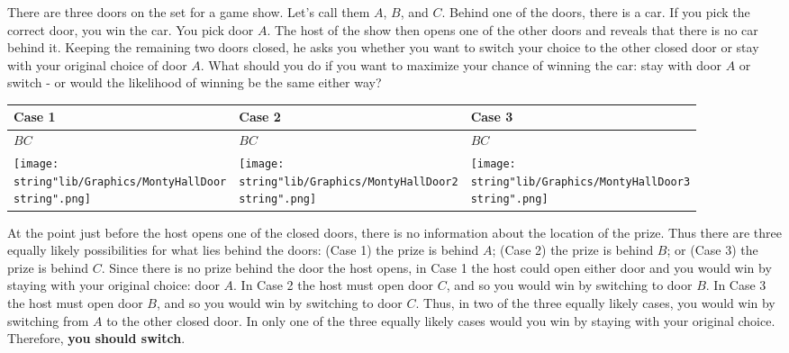 \documentclass[11pt,a4paper]{book}
\begin{document}
\begin{example}

There are three doors on the set for a game show. Let's
call them $A$, $B$, and $C$. Behind one of the doors, there is
a car. If you pick the correct door, you win the car. You pick door
$A$. The host of the show then opens one of the other doors and reveals
that there is no car behind it. Keeping the remaining two doors closed,
he asks you whether you want to switch your choice to the other closed
door or stay with your original choice of door $A$. What should you
do if you want to maximize your chance of winning the car: stay with
door $A$ or switch - or would the likelihood of winning be the same
either way?

\Solution

\begin{center}
\setlength{\extrarowheight}{2pt}%
\begin{tabular}{|>{\centering}p{4cm}|>{\centering}p{4cm}|>{\centering}p{4cm}|}
\hline
Case 1 & Case 2 & Case 3\tabularnewline
\hline
$B$\hspace{1.3cm}$C$ & $B$\hspace{1.3cm}$C$ & $B$\hspace{1.3cm}$C$\tabularnewline
\texttt{[image: \\string"lib/Graphics/MontyHallDoor\\string".png]} & \texttt{[image: \\string"lib/Graphics/MontyHallDoor2\\string".png]} & \texttt{[image: \\string"lib/Graphics/MontyHallDoor3\\string".png]}\tabularnewline
\hline
\end{tabular}
\par\end{center}

At the point just before the host opens one of the closed doors, there
is no information about the location of the prize. Thus there are
three equally likely possibilities for what lies behind the doors:
(Case 1) the prize is behind $A$; (Case 2) the prize is behind $B$;
or (Case 3) the prize is behind $C$. Since there is no prize behind
the door the host opens, in Case 1 the host could open either door
and you would win by staying with your original choice: door $A$.
In Case 2 the host must open door $C$, and so you would win by switching
to door $B$. In Case 3 the host must open door $B$, and so you would
win by switching to door $C$. Thus, in two of the three equally likely
cases, you would win by switching from $A$ to the other closed door.
In only one of the three equally likely cases would you win by staying
with your original choice. Therefore, \textbf{you should switch}.
\end{example}
\end{document}
